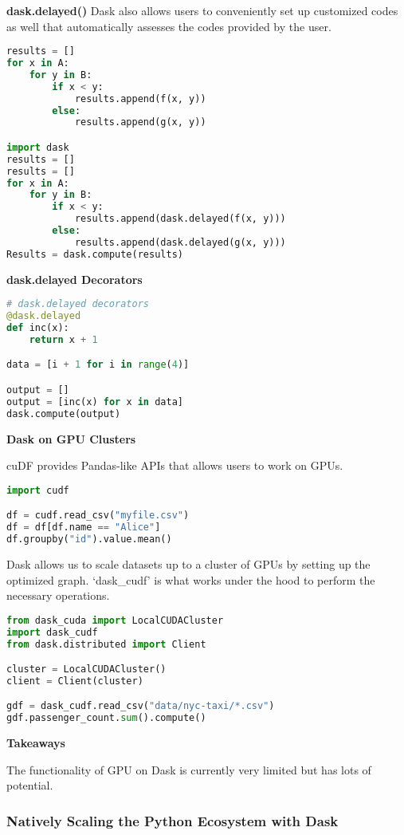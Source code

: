 \documentclass{article}
\begin{document}
\textbf{dask.delayed()}
Dask also allows users to conveniently set up customized codes as well that automatically assesses the codes provided by the user.

\begin{lstlisting}[language=Python]
results = []
for x in A:
    for y in B:
        if x < y:
            results.append(f(x, y))
        else:
            results.append(g(x, y))

import dask
results = []
results = []
for x in A:
    for y in B:
        if x < y:
            results.append(dask.delayed(f(x, y)))
        else:
            results.append(dask.delayed(g(x, y)))
Results = dask.compute(results)
\end{lstlisting}

\textbf{dask.delayed Decorators}

\begin{lstlisting}[language=Python]
# dask.delayed decorators
@dask.delayed
def inc(x):
    return x + 1

data = [i + 1 for i in range(4)]

output = []
output = [inc(x) for x in data]
dask.compute(output)
\end{lstlisting}

\textbf{Dask on GPU Clusters}

cuDF provides Pandas-like APIs that allows users to work on GPUs.
\begin{lstlisting}[language=Python]
import cudf

df = cudf.read_csv("myfile.csv")
df = df[df.name == "Alice"]
df.groupby("id").value.mean()
\end{lstlisting}

Dask allows us to scale datasets up to a cluster of GPUs by setting up the optimized graph. `dask\_cudf' is what works under the hood to perform the necessary operations.
\begin{lstlisting}[language=Python]
from dask_cuda import LocalCUDACluster
import dask_cudf
from dask.distributed import Client

cluster = LocalCUDACluster()
client = Client(cluster)

gdf = dask_cudf.read_csv("data/nyc-taxi/*.csv")
gdf.passenger_count.sum().compute()
\end{lstlisting}

\textbf{Takeaways}

The functionality of GPU on Dask is currently very limited but has lots of potential.

\subsubsection{Natively Scaling the Python Ecosystem with Dask}
\end{document}
